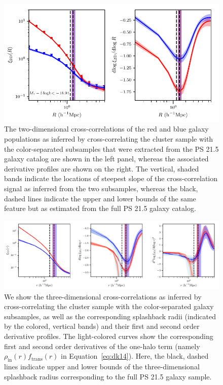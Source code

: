\documentclass[iop, apjl, twocolappendix, numberedappendix]{emulateapj}
\begin{document}
\begin{figure}
    \includegraphics[scale=0.65]{color_separated_2D_with_spline_no_mc.pdf}
\caption{The two-dimensional cross-correlations
of the red and blue galaxy populations as inferred by
cross-correlating the cluster sample with the color-separated
subsamples that were extracted from the PS 21.5 galaxy catalog are
shown in the left panel, whereas the associated derivative profiles
are shown on the right. The vertical, shaded bands indicate the
locations of steepest slope of the cross-correlation signal as
inferred from the two subsamples, whereas the black, dashed lines
indicate the upper and lower bounds of the same feature but as
estimated from the full PS 21.5 galaxy catalog. }
   \label{fig:color_curve_2D} 
\end{figure}
\begin{figure}
    \includegraphics[scale=0.76]{color_separated_3D_with_spline_no_mc.pdf}
\caption{We show the three-dimensional cross-correlations as
inferred by cross-correlating the cluster sample with the
color-separated galaxy subsamples, as well as the corresponding
splashback radii (indicated by the colored, vertical bands) and
their first and second order derivative profiles. The light-colored 
curves show the corresponding first and second order derivatives of the one-halo
term (namely $\rho_{\mathrm{in}}(r)f_{\mathrm{trans}}(r)$ in Equation~\ref{eq:dk14}).
Here, the black, dashed lines indicate upper and lower bounds of the 
three-dimensional splashback radius corresponding to the full PS 21.5 galaxy sample.}
   \label{fig:color_curve_3D} 
\end{figure}
\end{document}
